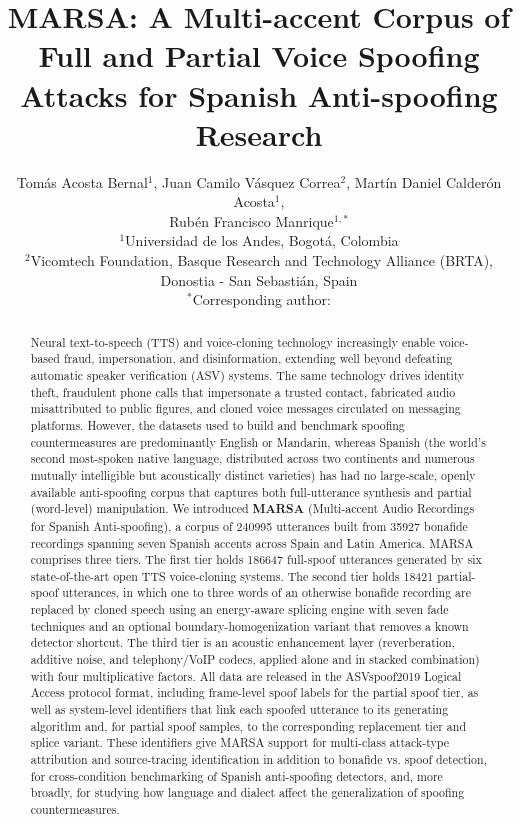 \documentclass[11pt]{article}
\title{\textbf{MARSA: A Multi-accent Corpus of Full and
Partial Voice Spoofing Attacks for Spanish Anti-spoofing Research}}
\author{%
Tom\'as Acosta Bernal$^{1}$, Juan Camilo V\'asquez Correa$^{2}$,
Mart\'in Daniel Calder\'on Acosta$^{1}$,\\
Rub\'en Francisco Manrique$^{1,\ast}$ \\[4pt]
\small $^{1}$Universidad de los Andes, Bogot\'a, Colombia \\
\small $^{2}$Vicomtech Foundation, Basque Research and Technology Alliance (BRTA), Donostia - San Sebastián, Spain \\
\small $^{\ast}$Corresponding author: \PENDING{email}
}
\date{}
\begin{document}
\maketitle

\begin{abstract}
\noindent
Neural text-to-speech (TTS) and voice-cloning technology increasingly
enable voice-based fraud, impersonation, and disinformation, extending
well beyond defeating automatic speaker verification (ASV) systems. The
same technology drives identity theft, fraudulent phone calls that
impersonate a trusted contact, fabricated audio misattributed to public
figures, and cloned voice messages circulated on messaging platforms. However, the datasets used to build and benchmark spoofing countermeasures
are predominantly English or Mandarin, whereas  Spanish (the world's second
most-spoken native language, distributed across two continents and
numerous mutually intelligible but acoustically distinct varieties) has
had no large-scale, openly available anti-spoofing corpus that captures
both full-utterance synthesis and partial (word-level) manipulation. We introduced \textbf{MARSA} (Multi-accent Audio Recordings for Spanish
Anti-spoofing), a corpus of 240995 utterances built
from 35927 bonafide recordings spanning seven Spanish accents across
Spain and Latin America. MARSA comprises three tiers. The first tier holds 186647 full-spoof
utterances generated by six state-of-the-art open TTS voice-cloning
systems. The second tier holds 18421 partial-spoof utterances, in
which one to three words of an otherwise bonafide recording are replaced
by cloned speech using an energy-aware splicing engine with seven fade
techniques and an optional boundary-homogenization variant that removes
a known detector shortcut. The third tier is an acoustic
enhancement layer (reverberation, additive noise, and telephony/VoIP codecs, applied
alone and in stacked combination) with four multiplicative factors. All data are released in the ASVspoof2019 Logical Access protocol format, including frame-level spoof labels for the partial spoof tier, as well as system-level identifiers that link each spoofed utterance to its generating algorithm and, for partial spoof samples, to the corresponding replacement tier and splice variant. These identifiers give MARSA
support for multi-class attack-type attribution and source-tracing
identification in addition to bonafide vs. spoof detection, for
cross-condition benchmarking of Spanish anti-spoofing detectors, and,
more broadly, for studying how language and dialect affect the
generalization of spoofing countermeasures.
\end{abstract}
\end{document}
